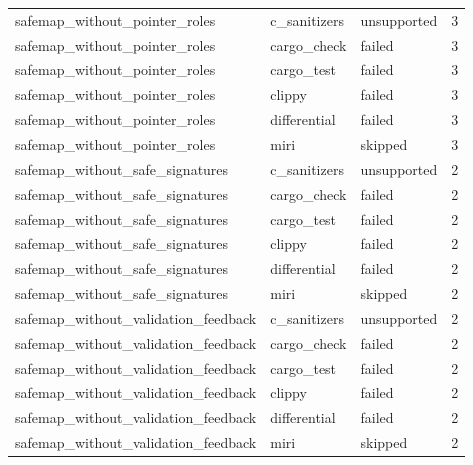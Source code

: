 \begin{table}[t]
\begin{tabular}{lllr}
safemap\_without\_pointer\_roles & c\_sanitizers & unsupported & 3 \\
safemap\_without\_pointer\_roles & cargo\_check & failed & 3 \\
safemap\_without\_pointer\_roles & cargo\_test & failed & 3 \\
safemap\_without\_pointer\_roles & clippy & failed & 3 \\
safemap\_without\_pointer\_roles & differential & failed & 3 \\
safemap\_without\_pointer\_roles & miri & skipped & 3 \\
safemap\_without\_safe\_signatures & c\_sanitizers & unsupported & 2 \\
safemap\_without\_safe\_signatures & cargo\_check & failed & 2 \\
safemap\_without\_safe\_signatures & cargo\_test & failed & 2 \\
safemap\_without\_safe\_signatures & clippy & failed & 2 \\
safemap\_without\_safe\_signatures & differential & failed & 2 \\
safemap\_without\_safe\_signatures & miri & skipped & 2 \\
safemap\_without\_validation\_feedback & c\_sanitizers & unsupported & 2 \\
safemap\_without\_validation\_feedback & cargo\_check & failed & 2 \\
safemap\_without\_validation\_feedback & cargo\_test & failed & 2 \\
safemap\_without\_validation\_feedback & clippy & failed & 2 \\
safemap\_without\_validation\_feedback & differential & failed & 2 \\
safemap\_without\_validation\_feedback & miri & skipped & 2 \\
\hline
\end{tabular}
\end{table}
